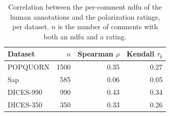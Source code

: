 \begin{table}[t]
\small
\centering
\caption{Correlation between the per-comment \ac{ndfu} of the human annotations and the polarization ratings, per dataset. $n$ is the number of comments with both an \ac{ndfu} and a rating.}
\label{tab:human-ndfu-rating-correlations}
\begin{tabular}{lrrr}
\toprule
Dataset & $n$ & Spearman $\rho$ & Kendall $\tau_b$ \\
\midrule
POPQUORN & 1500 & 0.35 & 0.27 \\
Sap & 585 & 0.06 & 0.05 \\
DICES-990 & 990 & 0.43 & 0.34 \\
DICES-350 & 350 & 0.33 & 0.26 \\
\bottomrule
\end{tabular}
\end{table}
